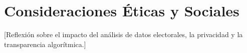\chapter{Consideraciones Éticas y Sociales}

[Reflexión sobre el impacto del análisis de datos electorales, la privacidad y la transparencia algorítmica.]
